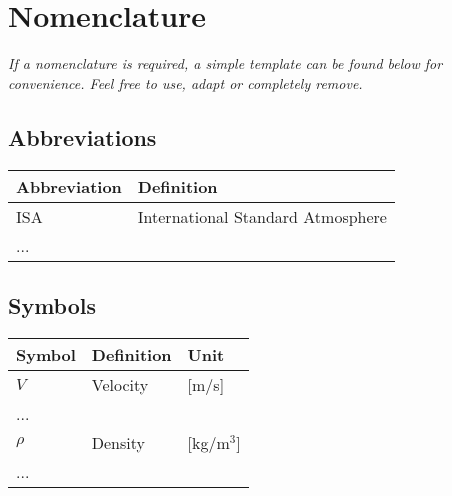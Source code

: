 \chapter*{Nomenclature}

\emph{If a nomenclature is required, a simple template can be found below for convenience. Feel free to use, adapt or completely remove.}

\section*{Abbreviations}

\begin{longtable}{p{2.5cm}p{8cm}}
    \toprule
    Abbreviation & Definition \\
    \midrule\endhead %
    ISA & International Standard Atmosphere \\
    ... \\
    \bottomrule
\end{longtable}

\section*{Symbols}

\begin{longtable}{p{2.5cm}p{8cm}p{2.5cm}}
    \toprule
    Symbol & Definition & Unit \\
    \midrule\endhead %
    $V$ & Velocity & [m/s] \\
    ... \\
    \midrule %
    $\rho$ & Density & [kg/m$^3$] \\
    ... \\
    \bottomrule
\end{longtable}
